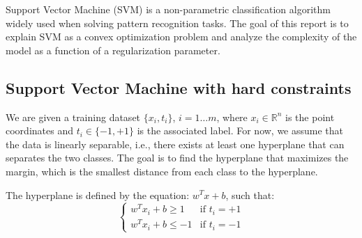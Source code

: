 \label{sec:intro}

Support Vector Machine (SVM) is a non-parametric classification algorithm widely used when solving pattern recognition tasks. The goal of this report is to explain SVM as a convex optimization problem and analyze the complexity of the model as a function of a regularization parameter.
\subsection{Support Vector Machine with hard constraints}
We are given a training dataset $\{x_i, t_i\}$, $i=1\ldots m$, where $x_i \in \mathbb{R}^n$ is the point coordinates and  $t_i \in \{-1,+1 \}$ is the associated label. For now, we assume that the data is linearly separable, i.e., there exists at least one hyperplane that can separates the two classes. The goal is to find the hyperplane that maximizes the margin, which is the smallest distance from each class to the hyperplane.

The hyperplane is defined by the equation: $w^Tx+b$, such that:
\[
  \begin{cases} 
   w^Tx_i+b \geq 1 & \text{if } t_i=+1 \\
   w^Tx_i+b \leq -1       & \text{if } t_i=-1
  \end{cases}
\]

